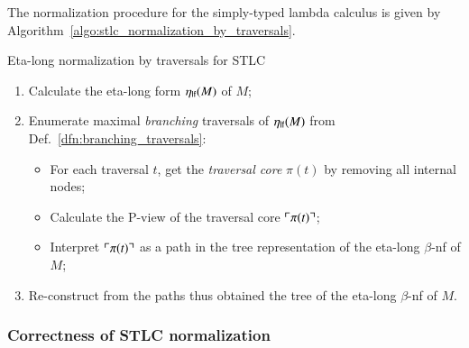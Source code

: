 \documentclass{elsarticle}
\theoremstyle{plain}
\theoremstyle{definition}
\theoremstyle{remark}
\def\coresymbol{\pi} %
\newcommand{\core}[1]{\coresymbol(#1)} %
\begin{document}
The normalization procedure for the simply-typed lambda calculus is given by Algorithm~\ref{algo:stlc_normalization_by_traversals}.

\begin{algorithm}[!ht]
\caption{Eta-long normalization by traversals for STLC}
\label{algo:stlc_normalization_by_traversals}
\begin{algorithmic}
\begin{enumerate}[nosep]
  \item Calculate the eta-long form $\eta_{\sf lf}(M)$ of $M$;
  \item Enumerate maximal \emph{branching} traversals of $\eta_{\sf lf}(M)$ from Def.~\ref{dfn:branching_traversals}:
  \begin{itemize}[nosep]
  \item For each traversal $t$, get the \emph{traversal core} $\core{t}$ by removing all internal nodes;
  \item Calculate the P-view of the traversal core $\pview{\core{t}}$;
  \item Interpret $\pview{\core{t}}$ as a path in the tree representation of the eta-long $\beta$-nf of $M$;
  \end{itemize}
  \item Re-construct from the paths thus obtained the tree of the eta-long $\beta$-nf of $M$.
\end{enumerate}
\end{algorithmic}
\end{algorithm}

\subsubsection*{Correctness of STLC normalization}

\end{document}
